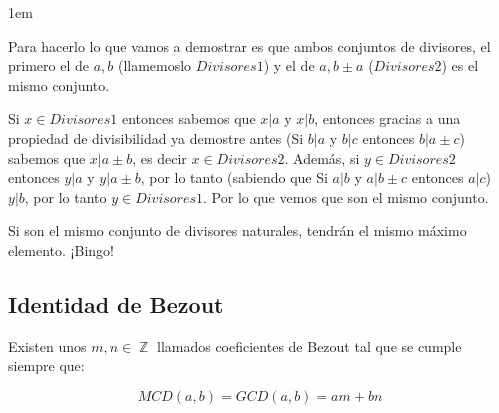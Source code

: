 \documentclass[12pt]{report}                                    %
\newenvironment{SmallIndentation}[1][0.75em]                    %
    {\begin{adjustwidth}{#1}{}\begin{footnotesize}}                 %
    {\end{footnotesize}\end{adjustwidth}}                           %
\DeclareMathOperator \Integers  {\mathbb{Z}}                     %
\begin{document}
\begin{itemize}
\begin{SmallIndentation}[1em]
                        Para hacerlo lo que vamos a demostrar es que ambos conjuntos de divisores, el
                        primero el de $a,b$ (llamemoslo $Divisores1$) y el de $a, b \pm a$ ($Divisores2$)
                        es el mismo conjunto.

                        Si $x \in Divisores1$ entonces sabemos que $x|a$ y $x|b$, entonces gracias a una
                        propiedad de divisibilidad ya demostre antes (Si $b|a$ y $b|c$ entonces $b|a\pm c$)
                        sabemos que $x|a \pm b$, es decir $x \in Divisores2$. Además, si $y \in Divisores2$
                        entonces $y|a$ y $y|a \pm b$, por lo tanto (sabiendo que Si $a|b$ y $a|b \pm c$
                        entonces $a|c$) $y|b$, por lo tanto $y \in Divisores1$. Por lo que vemos que son el
                        mismo conjunto.

                        Si son el mismo conjunto de divisores naturales, tendrán el mismo máximo elemento.
                        ¡Bingo!

                        

                    \end{SmallIndentation} 

            \end{itemize}




        \clearpage
        \subsection{Identidad de Bezout}

            Existen unos $m, n \in \Integers$ llamados coeficientes de Bezout tal que se
            cumple siempre que:

            \begin{equation}
                MCD(a,b) = GCD(a,b) = am+bn
            \end{equation}
\end{document}
